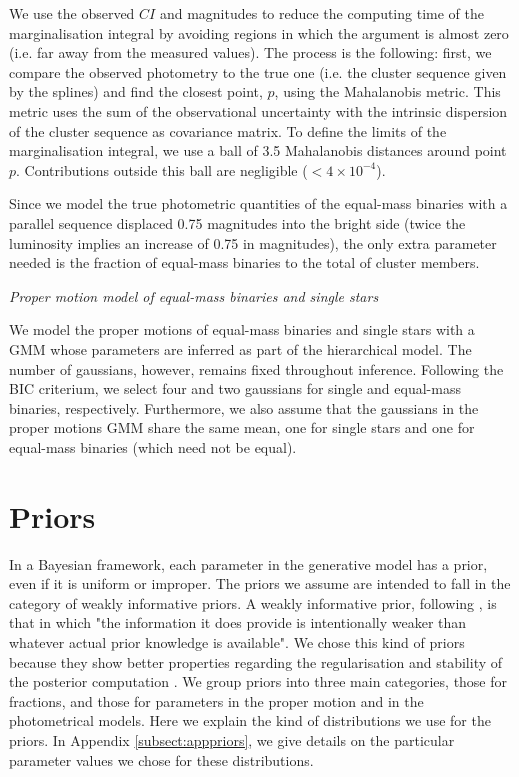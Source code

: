 We use the observed $CI$ and magnitudes to reduce the computing time of the marginalisation integral by avoiding regions in which the argument is almost zero (i.e. far away from the measured values). The process is the following: first, we compare the observed photometry to the true one (i.e. the cluster sequence given by the splines) and find the closest point, $p$, using the Mahalanobis metric. This metric uses the sum of the observational uncertainty with the intrinsic dispersion of the cluster sequence as covariance matrix. To define the limits of the marginalisation integral, we use a ball of 3.5 Mahalanobis distances around point $p$. Contributions outside this ball are negligible ($< 4\times10^{-4}$).

Since we model the true photometric quantities of the equal-mass binaries with a parallel sequence displaced 0.75 magnitudes into the bright side (twice the luminosity implies an increase of 0.75 in magnitudes), the only extra parameter needed is the fraction of equal-mass binaries to the total of cluster members.

\emph{Proper motion model of equal-mass binaries and single stars}

We model the proper motions of equal-mass binaries and single stars with a GMM whose parameters are inferred as part of the hierarchical model. The number of gaussians, however, remains fixed throughout inference. Following the BIC criterium, we select four and two gaussians for single and equal-mass binaries, respectively. Furthermore, we also assume that the gaussians in the proper motions GMM share the same mean, one for single stars and one for equal-mass binaries (which need not be equal).
\section{Priors}
\label{subsect:priors}
In a Bayesian framework, each parameter in the generative model has a prior, even if it is uniform or improper. The priors we assume are intended to fall in the category of weakly informative priors. A weakly informative prior, following \citet{Gelman2006}, is that in which "the information it does provide is intentionally weaker than whatever actual prior knowledge is available". We chose this kind of priors because they show better properties regarding the regularisation and stability of the posterior computation \cite[see][for examples of this kind of priors]{Gelman2008,Chung2013}. We group priors into three main categories, those for fractions, and those for parameters in the proper motion and in the photometrical models. Here we explain the kind of distributions we use for the priors. In Appendix \ref{subsect:apppriors}, we give details on the particular parameter values we chose for these distributions.

